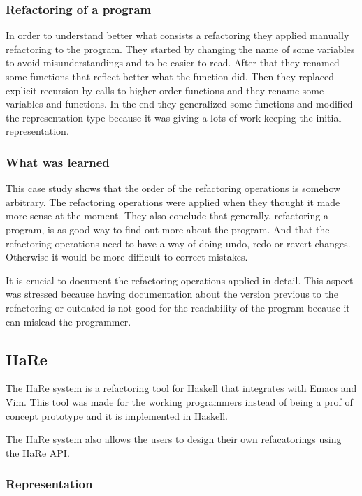 \subsubsection{Refactoring of a program}
In order to understand better what consists a refactoring they applied manually refactoring to the program.
They started by changing the name of some variables to avoid misunderstandings and to be easier to read.
After that they renamed some functions that reflect better what the function did. 
Then they replaced explicit recursion by calls to higher order functions and they rename some variables and functions.
In the end they generalized some functions and modified the representation type because it was giving a lots of work keeping the initial representation.

\subsubsection{What was learned}
This case study shows that the order of the refactoring operations is somehow arbitrary.
The refactoring operations were applied when they thought it made more sense at the moment.
They also conclude that generally, refactoring a program, is as good way to find out more about the program. 
And that the refactoring operations need to have a way of doing undo, redo or revert changes. 
Otherwise it would be more difficult to correct mistakes.

It is crucial to document the refactoring operations applied in detail. 
This aspect was stressed because having documentation about the version previous to the refactoring or outdated is not good for the readability of the program because it can mislead the programmer.


\subsection{HaRe}

The HaRe system is a refactoring tool for Haskell that integrates with Emacs and Vim.
This tool was made for the working programmers instead of being a prof of concept prototype and it is implemented in Haskell.

The HaRe system also allows the users to design their own refacatorings using the HaRe API.

\subsubsection{Representation}
\hfill \break


